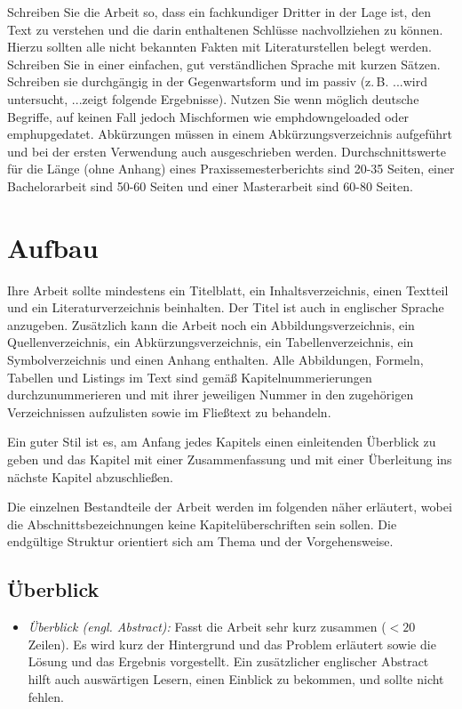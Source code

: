 \documentclass[conference,final,a4paper]{IEEEtran}
\begin{document}
Schreiben Sie die Arbeit so, dass ein fachkundiger Dritter in der Lage ist, den Text zu verstehen und die darin enthaltenen Schlüsse nachvollziehen zu können. Hierzu sollten alle nicht bekannten Fakten mit Literaturstellen belegt werden. Schreiben Sie in einer einfachen, gut verständlichen Sprache mit kurzen Sätzen. Schreiben sie durchgängig in der Gegenwartsform und im passiv (z.\,B. ...wird untersucht, ...zeigt folgende Ergebnisse). Nutzen Sie wenn möglich deutsche Begriffe, auf keinen Fall jedoch Mischformen wie emph{downgeloaded} oder emph{upgedatet}. Abkürzungen müssen in einem Abkürzungsverzeichnis aufgeführt und bei der ersten Verwendung auch ausgeschrieben werden. Durchschnittswerte für die Länge (ohne Anhang) eines Praxissemesterberichts sind 20-35 Seiten, einer Bachelorarbeit sind 50-60 Seiten und einer Masterarbeit sind 60-80 Seiten.

\section{Aufbau}

Ihre Arbeit sollte mindestens ein Titelblatt, ein Inhaltsverzeichnis, einen Textteil und ein Literaturverzeichnis beinhalten. Der Titel ist auch in englischer Sprache anzugeben. Zusätzlich kann die Arbeit noch ein Abbildungsverzeichnis, ein Quellenverzeichnis, ein Abkürzungsverzeichnis, ein Tabellenverzeichnis, ein Symbolverzeichnis und einen Anhang enthalten. Alle Abbildungen, Formeln, Tabellen und Listings im Text sind gemäß Kapitelnummerierungen durchzunummerieren und mit ihrer jeweiligen Nummer in den zugehörigen Verzeichnissen aufzulisten sowie im Fließtext zu behandeln.

Ein guter Stil ist es, am Anfang jedes Kapitels einen einleitenden Überblick zu geben und das Kapitel mit einer Zusammenfassung und mit einer Überleitung ins nächste Kapitel abzuschließen. 

Die einzelnen Bestandteile der Arbeit werden im folgenden näher erläutert, wobei die Abschnittsbezeichnungen keine Kapitelüberschriften sein sollen. Die endgültige Struktur orientiert sich am Thema und der Vorgehensweise.

\subsection{Überblick}
\begin{itemize}
\item \emph{Überblick (engl. Abstract):} Fasst die Arbeit sehr kurz zusammen ($<20$ Zeilen). Es wird kurz der Hintergrund und das Problem erläutert sowie die Lösung und das Ergebnis vorgestellt. Ein zusätzlicher englischer Abstract hilft auch auswärtigen Lesern, einen Einblick zu bekommen, und sollte nicht fehlen.
\end{itemize}
\end{document}
